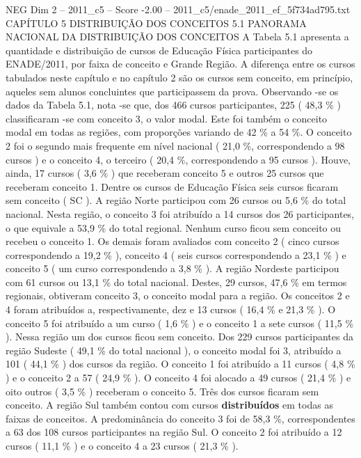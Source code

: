 \begin{textsample}{NEG Dim 2 – 2011\_c5 – Score -2.00 – 2011\_c5/enade\_2011\_ef\_5f734ad795.txt}  \label{ex:f2_neg_090}
CAPÍTULO 5 DISTRIBUIÇÃO DOS CONCEITOS 5.1 PANORAMA NACIONAL DA DISTRIBUIÇÃO DOS CONCEITOS A Tabela 5.1 apresenta a quantidade e distribuição de cursos de Educação Física participantes do ENADE/2011, por faixa de conceito e Grande Região.
A diferença entre os cursos tabulados neste capítulo e no capítulo 2 são os cursos sem conceito, em princípio, aqueles sem alunos concluintes que participassem da prova.
Observando -se os dados da Tabela 5.1, nota -se que, dos 466 cursos participantes, 225 ( 48,3 \% ) classificaram -se com conceito 3, o valor modal.
Este foi também o conceito modal em todas as regiões, com proporções variando de 42 \% a 54 \%.
O conceito 2 foi o segundo mais frequente em nível nacional ( 21,0 \%, correspondendo a 98 cursos ) e o conceito 4, o terceiro ( 20,4 \%, correspondendo a 95 cursos ).
Houve, ainda, 17 cursos ( 3,6 \% ) que receberam conceito 5 e outros 25 cursos que receberam conceito 1.
Dentre os cursos de Educação Física seis cursos ficaram sem conceito ( SC ).
A região Norte participou com 26 cursos ou 5,6 \% do total nacional.
Nesta região, o conceito 3 foi atribuído a 14 cursos dos 26 participantes, o que equivale a 53,9 \% do total regional.
Nenhum curso ficou sem conceito ou recebeu o conceito 1.
Os demais foram avaliados com conceito 2 ( cinco cursos correspondendo a 19,2 \% ), conceito 4 ( seis cursos correspondendo a 23,1 \% ) e conceito 5 ( um curso correspondendo a 3,8 \% ).
A região Nordeste participou com 61 cursos ou 13,1 \% do total nacional.
Destes, 29 cursos, 47,6 \% em termos regionais, obtiveram conceito 3, o conceito modal para a região.
Os conceitos 2 e 4 foram atribuídos a, respectivamente, dez e 13 cursos ( 16,4 \% e 21,3 \% ).
O conceito 5 foi atribuído a um curso ( 1,6 \% ) e o conceito 1 a sete cursos ( 11,5 \% ).
Nessa região um dos cursos ficou sem conceito.
Dos 229 cursos participantes da região Sudeste ( 49,1 \% do total nacional ), o conceito modal foi 3, atribuído a 101 ( 44,1 \% ) dos cursos da região.
O conceito 1 foi atribuído a 11 cursos ( 4,8 \% ) e o conceito 2 a 57 ( 24,9 \% ).
O conceito 4 foi alocado a 49 cursos ( 21,4 \% ) e oito outros ( 3,5 \% ) receberam o conceito 5.
Três dos cursos ficaram sem conceito.
A região Sul também contou com cursos \textbf{distribuídos} em todas as faixas de conceitos.
A predominância do conceito 3 foi de 58,3 \%, correspondentes a 63 dos 108 cursos participantes na região Sul.
O conceito 2 foi atribuído a 12 cursos ( 11,1 \% ) e o conceito 4 a 23 cursos ( 21,3 \% ).

\end{textsample}
